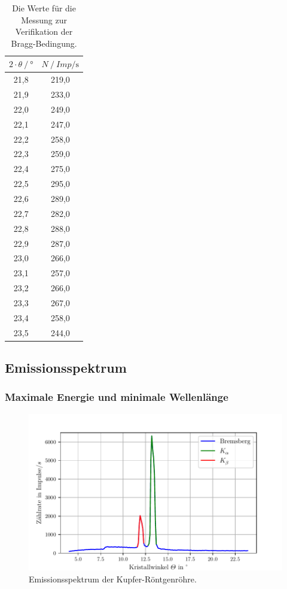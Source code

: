 \documentclass[a4paper]{scrartcl}
\begin{document}
\begin{table}[H]
  \centering
  \caption{Die Werte für die Messung zur Verifikation der Bragg-Bedingung.}
  \begin{tabular}{cc}
    \toprule
    {$ 2 \cdot \theta \mathbin{/} \unit{\degree}$} &
    {$ N \mathbin{/} Imp / \unit{\second}$} \\
    \midrule
    21,8 &  219,0 \\
    21,9 &  233,0 \\
    22,0 &  249,0 \\
    22,1 &  247,0 \\
    22,2 &  258,0 \\
    22,3 &  259,0 \\
    22,4 &  275,0 \\
    22,5 &  295,0 \\
    22,6 &  289,0 \\
    22,7 &  282,0 \\
    22,8 &  288,0 \\
    22,9 &  287,0 \\
    23,0 &  266,0 \\
    23,1 &  257,0 \\
    23,2 &  266,0 \\
    23,3 &  267,0 \\
    23,4 &  258,0 \\
    23,5 &  244,0 \\


    \bottomrule
  \end{tabular}
  \label{tab:Tab_bragg}
\end{table}




\subsection{Emissionsspektrum}
\label{subsec:emissionsspektrum}


\subsubsection*{Maximale Energie und minimale Wellenlänge}

\begin{figure}
  \centering
  \includegraphics{build/plot_cu.pdf}
  \caption{Emissionsspektrum der Kupfer-Röntgenröhre.}
  \label{fig:cu}
\end{figure}
\end{document}
